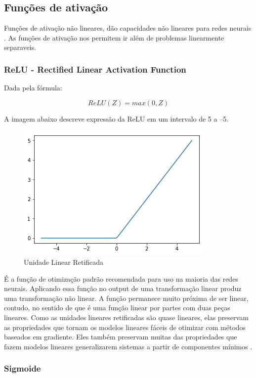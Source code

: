 \documentclass[12pt]{article}
\begin{document}
\subsection{Funções de ativação}

Funções de ativação não lineares, dão capacidades não lineares para redes neurais \cite{lecun:98}. As funções de ativação nos permitem ir além de problemas linearmente separaveis.

\subsubsection{ReLU - Rectified Linear Activation Function}

Dada pela fórmula:

\begin{equation}
    ReLU(Z) = max(0, Z)
\end{equation}

A imagem abaixo descreve expressão da ReLU em um intervalo de 5 a –5.

\begin{figure}[ht]
\centering
\includegraphics[width=.5\textwidth]{images/relu.png}
\caption{Unidade Linear Retificada}
\label{fig:relu}
\end{figure}

É a função de otimização padrão recomendada para uso na maioria das redes neurais. Aplicando essa função no output de uma transformação linear produz uma transformação não linear. A função permanece muito próxima de ser linear, contudo, no sentido de que é uma função linear por partes com duas peças lineares. Como as unidades lineares retificadas são quase lineares, elas preservam as propriedades que tornam os modelos lineares fáceis de otimizar com métodos baseados em gradiente. Eles também preservam muitas das propriedades que fazem modelos lineares generalizarem sistemas a partir de componentes mínimos \cite{Goodfellow-et-al-2016}.

\subsubsection{Sigmoide}
\end{document}

